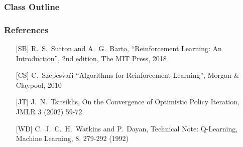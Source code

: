         \title[\whatshort, \simplenum, 
Slide \insertframenumber/\inserttotalframenumber ] {\what}

 

\subtitle{Class \simplenum: Reinforcement Learning}



\usepackage{graphicx}



\begin{frame}
  \titlepage

\end{frame}

\begin{frame}
  \frametitle{Class Outline} \tableofcontents %
\end{frame}




\begin{frame}[fragile]
\frametitle{References}

\begin{itemize}

\item[[SB{]}] R.~S.~Sutton and A.~G.~Barto, 
``Reinforcement Learning: An Introduction'', 2nd edition, The MIT
Press, 2018

\item[[CS{]}]  C.~Szepesva\'ri
``Algorithms for Reinforcement Learning'', Morgan \& Claypool, 2010

\item[[JT{]}] J.~N.~Tsitsiklis, On the Convergence of Optimistic Policy
Iteration, JMLR 3 (2002) 59-72

\item[[WD{]}] C.~J.~C.~H.~Watkins and P.~Dayan, Technical Note:
Q-Learning, Machine Learning, 8, 279-292 (1992)

\end{itemize}
\end{frame}

